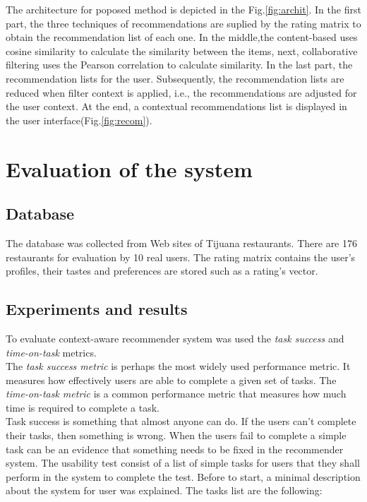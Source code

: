 The architecture for poposed method is depicted in the Fig.\ref{fig:archit}. In
the first part, the three techniques of recommendations are suplied by the
rating matrix to obtain the recommendation list of each one.  In the middle,the
content-based uses cosine similarity to calculate the similarity between the
items, next, collaborative filtering uses the Pearson correlation to calculate
similarity.  In the last part, the recommendation lists for the user.
Subsequently, the recommendation lists are reduced when filter context is
applied, i.e., the recommendations are adjusted for the user context. At the
end, a contextual recommendations list is displayed in the user
interface(Fig.\ref{fig:recom}).

\begin{figure*}
\captionsetup{justification=centering,margin=2cm}
\centering
{}
\caption{Architecture proposed.}
\label{fig:archit}    
\end{figure*}

\section{Evaluation of the system} \label{sec:4}

\subsection{Database}\label{sec:4.1}

The database was collected from Web sites of Tijuana restaurants. There are 176
restaurants for evaluation by 10 real users. The rating matrix contains the
user’s profiles, their tastes and preferences are stored such as a rating’s
vector.

\subsection{Experiments and results}\label{sec:4.2}

To evaluate context-aware recommender system was used the \textit{task success}
and \textit{time-on-task} metrics. \\ The \textit{task success metric} is
perhaps the most widely used performance metric. It measures how effectively
users are able to complete a given set of tasks.  The \textit{time-on-task
metric} is a common performance metric that measures how much time is required
to complete a task\cite{albert2013measuring}.\\ Task success is something that
almost anyone can do.  If the users can’t complete their tasks, then something
is wrong.  When the users fail to complete a simple task can be an evidence that
something needs to be fixed in the recommender system.  The usability test
consist of a list of simple tasks for users that they shall perform in the
system to complete the test. Before to start, a minimal description about the
system for user was explained. The tasks list are the following:

